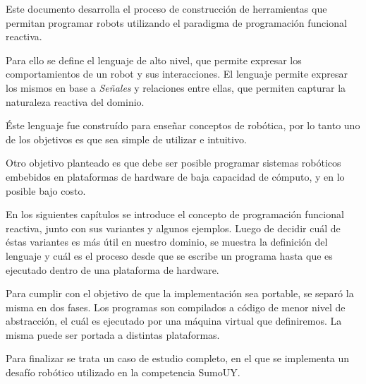 
  Este documento desarrolla el proceso de construcción de
herramientas
que permitan programar robots utilizando el paradigma de
programación funcional reactiva.

  Para ello se define el lenguaje \frob{} de alto nivel,
que permite expresar los comportamientos de un robot y sus
interacciones.
  El lenguaje permite expresar los mismos en base a
\emph{Señales} y relaciones entre ellas, que permiten
capturar la naturaleza reactiva del dominio.

  Éste lenguaje fue construído para
enseñar conceptos de robótica, por lo tanto
uno de los objetivos es que sea simple de
utilizar e intuitivo.

  Otro objetivo planteado es que debe ser posible programar
sistemas robóticos embebidos en plataformas de
hardware de baja capacidad de cómputo, y en lo posible
bajo costo.

  En los siguientes capítulos se introduce el concepto de
programación funcional reactiva, junto con sus variantes y
algunos ejemplos.
  Luego de decidir cuál de éstas variantes es más útil
en nuestro dominio, se muestra la definición del lenguaje
\frob{} y cuál es el proceso desde que se escribe un programa
hasta que es ejecutado dentro de una plataforma de hardware.

  Para cumplir con el objetivo de que la implementación sea
portable, se separó la misma en dos fases. Los programas son
compilados a código \alf{} de menor nivel de abstracción,
el cuál es ejecutado por una máquina virtual que definiremos.
  La misma puede ser portada a distintas plataformas.

  Para finalizar se trata un caso de estudio completo, en el
que se implementa un desafío robótico utilizado en la competencia
SumoUY.
